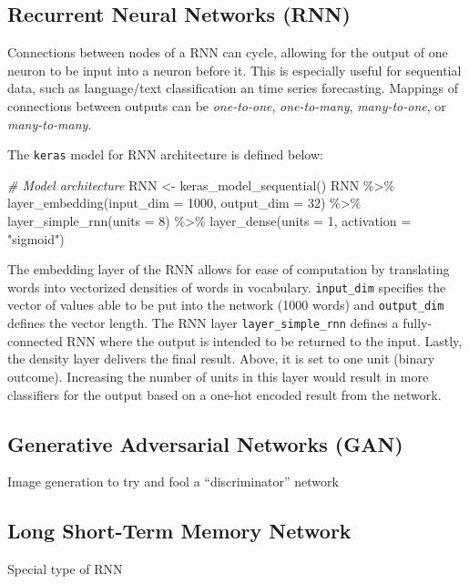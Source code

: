 \documentclass[
]{article}
\newenvironment{Shaded}{\begin{snugshade}}{\end{snugshade}}
\newcommand{\AttributeTok}[1]{\textcolor[rgb]{0.77,0.63,0.00}{#1}}
\newcommand{\CommentTok}[1]{\textcolor[rgb]{0.56,0.35,0.01}{\textit{#1}}}
\newcommand{\DecValTok}[1]{\textcolor[rgb]{0.00,0.00,0.81}{#1}}
\newcommand{\FunctionTok}[1]{\textcolor[rgb]{0.00,0.00,0.00}{#1}}
\newcommand{\NormalTok}[1]{#1}
\newcommand{\OtherTok}[1]{\textcolor[rgb]{0.56,0.35,0.01}{#1}}
\newcommand{\SpecialCharTok}[1]{\textcolor[rgb]{0.00,0.00,0.00}{#1}}
\newcommand{\StringTok}[1]{\textcolor[rgb]{0.31,0.60,0.02}{#1}}
\begin{document}
\hypertarget{recurrent-neural-networks-rnn}{%
\subsection{Recurrent Neural Networks
(RNN)}\label{recurrent-neural-networks-rnn}}

Connections between nodes of a RNN can cycle, allowing for the output of
one neuron to be input into a neuron before it.
\cite{medsker2001recurrent} This is especially useful for sequential
data, such as language/text classification an time series forecasting.
Mappings of connections between outputs can be \emph{one-to-one},
\emph{one-to-many}, \emph{many-to-one}, or \emph{many-to-many}.

The \texttt{keras} model for RNN architecture is defined below:

\begin{Shaded}
\begin{Highlighting}[]
\CommentTok{\# Model architecture}
\NormalTok{RNN }\OtherTok{\textless{}{-}} \FunctionTok{keras\_model\_sequential}\NormalTok{()}
\NormalTok{        RNN }\SpecialCharTok{\%\textgreater{}\%}
        \FunctionTok{layer\_embedding}\NormalTok{(}\AttributeTok{input\_dim =} \DecValTok{1000}\NormalTok{, }\AttributeTok{output\_dim =} \DecValTok{32}\NormalTok{) }\SpecialCharTok{\%\textgreater{}\%}
        \FunctionTok{layer\_simple\_rnn}\NormalTok{(}\AttributeTok{units =} \DecValTok{8}\NormalTok{) }\SpecialCharTok{\%\textgreater{}\%}
        \FunctionTok{layer\_dense}\NormalTok{(}\AttributeTok{units =} \DecValTok{1}\NormalTok{, }\AttributeTok{activation =} \StringTok{"sigmoid"}\NormalTok{)}
\end{Highlighting}
\end{Shaded}

The embedding layer of the RNN allows for ease of computation by
translating words into vectorized densities of words in vocabulary.
\texttt{input\_dim} specifies the vector of values able to be put into
the network (1000 words) and \texttt{output\_dim} defines the vector
length. The RNN layer \texttt{layer\_simple\_rnn} defines a
fully-connected RNN where the output is intended to be returned to the
input. Lastly, the density layer delivers the final result. Above, it is
set to one unit (binary outcome). Increasing the number of units in this
layer would result in more classifiers for the output based on a one-hot
encoded result from the network.

\hypertarget{generative-adversarial-networks-gan}{%
\subsection{Generative Adversarial Networks
(GAN)}\label{generative-adversarial-networks-gan}}

Image generation to try and fool a ``discriminator'' network

\hypertarget{long-short-term-memory-network}{%
\subsection{Long Short-Term Memory
Network}\label{long-short-term-memory-network}}

Special type of RNN \cite{Rai}
\end{document}
